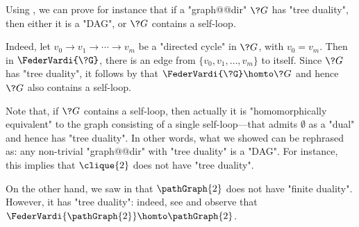 \begin{example}
	\label{ex:Feder-Vardi-P2}
	Using , we can prove for instance that
	if a "graph@@dir" $\?G$ has "tree duality", then either it is a "DAG", or $\?G$ contains
	a self-loop.

	Indeed, let $v_0 \to v_1 \to \cdots \to v_m$ be a "directed cycle" in $\?G$,
	with $v_0 = v_m$. Then in $\FederVardi{\?G}$, there is an edge from
	$\{v_0,v_1,\dotsc,v_m\}$ to itself.
	Since $\?G$ has "tree duality", it follows by 
	that $\FederVardi{\?G} \homto \?G$ and hence $\?G$ also contains a self-loop.
	
	Note that, if $\?G$ contains a self-loop, then actually it is "homomorphically equivalent" to the graph consisting of a single self-loop---that admits $\emptyset$ as a "dual" and hence has
	"tree duality". In other words, what we showed can be rephrased as: any
	non-trivial "graph@@dir" with "tree duality" is a "DAG".
	For instance, this implies that $\clique{2}$ does not have
	"tree duality".
	
	\begin{marginfigure}
		\centering
		\begin{tikzpicture}
			
		\end{tikzpicture}
		\caption{
			\AP\label{fig:P2-Feder-Vardi}
			The Feder-Vardi construction $\FederVardi{\pathGraph{2}}$
			on the "$2$-path".
		}
	\end{marginfigure}
	On the other hand, we saw in  that $\pathGraph{2}$ does not have
	"finite duality". However, it has "tree duality": indeed, see 
	and observe that $\FederVardi{\pathGraph{2}} \homto \pathGraph{2}$.
\end{example}